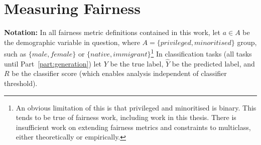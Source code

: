 
\section{Measuring Fairness}
\label{sec:measuring_fairness}

\textbf{Notation:} In all fairness metric definitions contained in this work, let $a \in A$ be the demographic variable in question, where $A = \{privileged, minoritised\}$ group, such as $\{male, female\}$ or $\{native, immigrant\}$\footnote{An obvious limitation of this is that privileged and minoritised is binary. This tends to be true of fairness work, including work in this thesis. There is insufficient work on extending fairness metrics and constraints to multiclass, either theoretically or empirically.} In classification tasks (all tasks until Part~\ref{part:generation}) let $Y$ be the true label, $\hat{Y}$ be the predicted label, and $R$ be the classifier score (which enables analysis independent of classifier threshold). 

